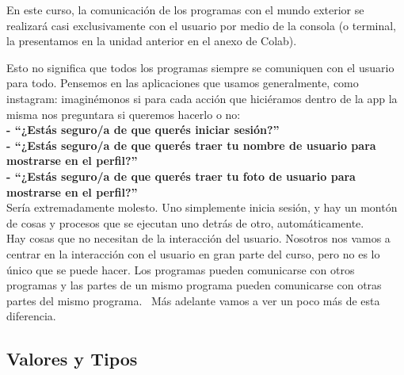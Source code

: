 \documentclass[
  letterpaper,
  DIV=11,
  numbers=noendperiod]{scrreprt}
\begin{document}
En este curso, la comunicación de los programas con el mundo exterior se
realizará casi exclusivamente con el usuario por medio de la consola (o
terminal, la presentamos en la unidad anterior en el anexo de Colab).

\begin{tcolorbox}[enhanced jigsaw, arc=.35mm, toptitle=1mm, colframe=quarto-callout-warning-color-frame, bottomtitle=1mm, opacitybacktitle=0.6, colbacktitle=quarto-callout-warning-color!10!white, leftrule=.75mm, coltitle=black, toprule=.15mm, titlerule=0mm, title=\textcolor{quarto-callout-warning-color}{\faExclamationTriangle}\hspace{0.5em}{¡Cuidado!}, bottomrule=.15mm, rightrule=.15mm, colback=white, breakable, opacityback=0, left=2mm]

Esto no significa que todos los programas siempre se comuniquen con el
usuario para todo. Pensemos en las aplicaciones que usamos generalmente,
como instagram: imaginémonos si para cada acción que hiciéramos dentro
de la app la misma nos preguntara si queremos hacerlo o no:\\

\textbf{- ``¿Estás seguro/a de que querés iniciar sesión?''}\\
\textbf{- ``¿Estás seguro/a de que querés traer tu nombre de usuario
para mostrarse en el perfil?''}\\
\textbf{- ``¿Estás seguro/a de que querés traer tu foto de usuario para
mostrarse en el perfil?''}\\

Sería extremadamente molesto. Uno simplemente inicia sesión, y hay un
montón de cosas y procesos que se ejecutan uno detrás de otro,
automáticamente.\\

Hay cosas que no necesitan de la interacción del usuario. Nosotros nos
vamos a centrar en la interacción con el usuario en gran parte del
curso, pero no es lo único que se puede hacer. Los programas pueden
comunicarse con otros programas y las partes de un mismo programa pueden
comunicarse con otras partes del mismo programa.~ Más adelante vamos a
ver un poco más de esta diferencia.

\end{tcolorbox}

\subsection{Valores y Tipos}\label{valores-y-tipos}
\end{document}
